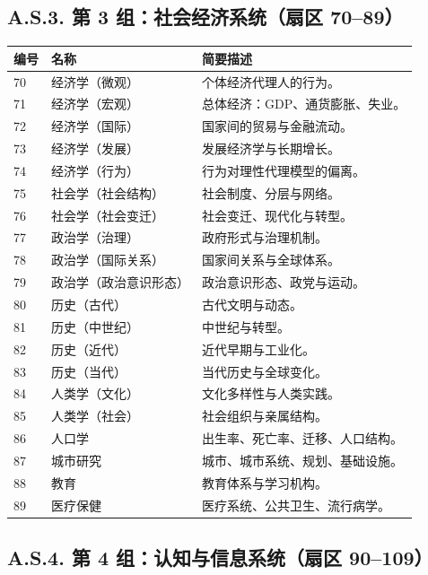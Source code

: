 \documentclass[11pt,a4paper]{article}
\begin{document}
	\subsection*{A.S.3. 第 3 组：社会经济系统（扇区 70--89）}
	
	\begin{longtable}{|p{0.9cm}|p{6.0cm}|p{8.6cm}|}
		\hline
		\textbf{编号} & \textbf{名称} & \textbf{简要描述} \\
		\hline
		\endhead
		70 & 经济学（微观） & 个体经济代理人的行为。 \\
		71 & 经济学（宏观） & 总体经济：GDP、通货膨胀、失业。 \\
		72 & 经济学（国际） & 国家间的贸易与金融流动。 \\
		73 & 经济学（发展） & 发展经济学与长期增长。 \\
		74 & 经济学（行为） & 行为对理性代理模型的偏离。 \\
		75 & 社会学（社会结构） & 社会制度、分层与网络。 \\
		76 & 社会学（社会变迁） & 社会变迁、现代化与转型。 \\
		77 & 政治学（治理） & 政府形式与治理机制。 \\
		78 & 政治学（国际关系） & 国家间关系与全球体系。 \\
		79 & 政治学（政治意识形态） & 政治意识形态、政党与运动。 \\
		80 & 历史（古代） & 古代文明与动态。 \\
		81 & 历史（中世纪） & 中世纪与转型。 \\
		82 & 历史（近代） & 近代早期与工业化。 \\
		83 & 历史（当代） & 当代历史与全球变化。 \\
		84 & 人类学（文化） & 文化多样性与人类实践。 \\
		85 & 人类学（社会） & 社会组织与亲属结构。 \\
		86 & 人口学 & 出生率、死亡率、迁移、人口结构。 \\
		87 & 城市研究 & 城市、城市系统、规划、基础设施。 \\
		88 & 教育 & 教育体系与学习机构。 \\
		89 & 医疗保健 & 医疗系统、公共卫生、流行病学。 \\
		\hline
	\end{longtable}
	
	\subsection*{A.S.4. 第 4 组：认知与信息系统（扇区 90--109）}
	
\end{document}
